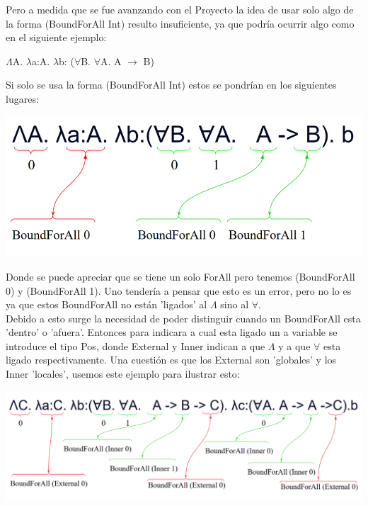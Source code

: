 \documentclass[12pt, titlepage, a4paper]{article}
\begin{document}
\begin{itemize}[label=$\bullet$]
{  Pero a medida que se fue avanzando con el Proyecto la idea de usar solo algo de la forma (BoundForAll Int) resulto insuficiente, ya que podría ocurrir algo 
  como en el siguiente ejemplo:
  
  \begin{center}
    $\Lambda$A. $\lambda$a:A. $\lambda$b: ($\forall$B. $\forall$A. A $\rightarrow$ B)
  \end{center}

  Si solo se usa la forma (BoundForAll Int) estos se pondrían en los siguientes lugares:

  \begin{center}
    \includegraphics[width=.8\textwidth]{Imagenes/EjemploBoundForAllFunction.png}
  \end{center}

  Donde se puede apreciar que se tiene un solo ForAll pero tenemos (BoundForAll 0) y (BoundForAll 1). Uno tendería a 
  pensar que esto es un error, pero no lo es ya que estos BoundForAll no están 'ligados' al $\Lambda$ sino al $\forall$.\\

  Debido a esto surge la necesidad de poder distinguir cuando un BoundForAll esta 'dentro' o 'afuera'. 
  Entonces para indicara a cual esta ligado un a variable se introduce el tipo Pos, donde External y Inner indican a que $\Lambda$ y a que $\forall$ esta 
  ligado respectivamente. 
  Una cuestión es que los External son 'globales' y los Inner 'locales', usemos este ejemplo para ilustrar esto:

  \begin{center}
    \includegraphics[width=1\textwidth]{Imagenes/EjemploBoundForAllFunction3.png}
  \end{center}

}
\end{itemize}
\end{document}
